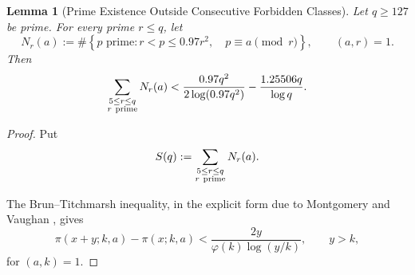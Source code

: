 \documentclass[11pt,a4paper]{article}
\newtheorem{lemma}[theorem]{Lemma}
\theoremstyle{definition}
\theoremstyle{remark}
\begin{document}
\begin{lemma}[Prime Existence Outside Consecutive Forbidden Classes]
Let $q\ge127$ be prime. For every prime $r\le q$, let
\[
N_r(a)
:=
\#\left\{
p\text{ prime}:
r<p\le0.97r^2,\quad
p\equiv a\pmod r
\right\},
\qquad (a,r)=1.
\]
Then
\[
\sum_{\substack{5\le r\le q\\r\ {\rm prime}}}N_r(a)
<
\frac{0.97q^2}{2\log(0.97q^2)}
-\frac{1.25506q}{\log q}.
\]
\end{lemma}

\begin{proof}
Put
\[
S(q):=
\sum_{\substack{5\le r\le q\\r\ {\rm prime}}}N_r(a).
\]

The Brun--Titchmarsh inequality, in the explicit form due to
Montgomery and Vaughan \cite{montgomeryVaughan1973}, gives
\[
    \pi(x+y;k,a)-\pi(x;k,a)
    <
    \frac{2y}{\varphi(k)\log(y/k)},
    \qquad y>k,
\]
for $(a,k)=1$.


\end{proof}
\end{document}
